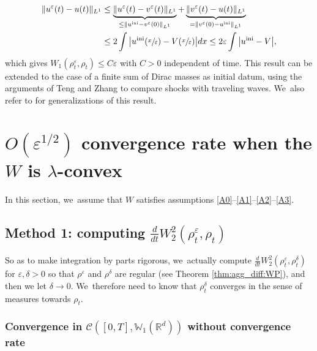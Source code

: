 \documentclass[JEP,XML,SOM,Unicode, NoFloatCountersInSection,published]{cedram}
\newcommand{\ini}{\mathrm{ini}}
\def\RR{\mathbb{R}}
\def\WW{\mathbb{W}}
\def\eps{\varepsilon}
\def\calC{{\mathcal C}}
\theoremstyle{plain}
\theoremstyle{definition}
\begin{document}
\begin{align*}
\|u^\eps(t) - u(t)\|_{L^1} &\leq \underbrace{\|u^\eps(t) - v^\eps(t)\|_{L^1}}_{\leq \|u^{\ini} - v^\eps(0)\|_{L^1}} + \underbrace{\|v^\eps(t) - u(t)\|_{L^1}}_{=\|v^\eps(0) - u^{\ini}\|_{L^1}}\\
&\leq 2 \int \big| u^{\ini}(\sfrac{x}{\eps}) - V(\sfrac{x}{\eps}) \big| dx
\leq 2 \eps \int \big| u^{\ini} - V \big|,
\end{align*}
which gives $W_1(\rho^\eps_t, \rho_t) \leq C\eps$ with $C>0$ independent of time. This result can be extended to the case of a finite sum of Dirac masses as initial datum, using the arguments of Teng and Zhang \cite{tengzhang97} to compare shocks with traveling waves. We~also refer to \cite{tang2001, tangteng97, teng98} for generalizations of this result.

\section{\texorpdfstring{$O(\eps^{1/2})$ convergence rate when the $W$ is $\lambda$-convex}{titlesection}}\label{section:lambdaConvex}

In this section, we~assume that $W$ satisfies assumptions \eqref{A0}--\eqref{A1}--\eqref{A2}--\eqref{A3}.

\subsection{Method 1: computing $\frac{d}{dt} W_2^2(\rho_t^\eps, \rho_t)$}\label{section:lambdaConvex:1}

So as to make integration by parts rigorous, we~actually compute $\frac{d}{dt} W_2^2(\rho_t^\eps, \rho_t^\delta)$ for $\eps,\delta >0$ so that $\rho^\eps$ and $\rho^\delta$ are regular (see Theorem \ref{thm:agg_diff:WP}), and then we let $\delta \to 0$. We~therefore need to know that $\rho_t^\delta$ converges in the sense of measures towards $\rho_t$.

\subsubsection{Convergence in $\calC([0,T], \WW_1(\RR^d))$ without convergence rate}
\end{document}
